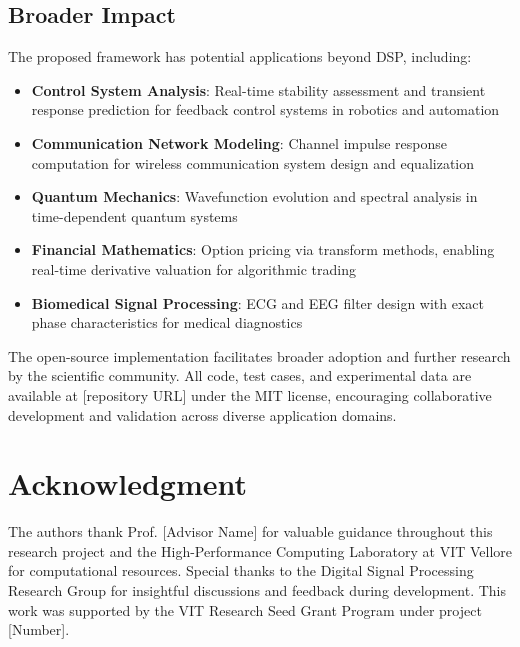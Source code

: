 \documentclass[conference]{IEEEtran}
\begin{document}
\subsection{Broader Impact}

The proposed framework has potential applications beyond DSP, including:

\begin{itemize}
    \item \textbf{Control System Analysis}: Real-time stability assessment and transient response prediction for feedback control systems in robotics and automation
    \item \textbf{Communication Network Modeling}: Channel impulse response computation for wireless communication system design and equalization
    \item \textbf{Quantum Mechanics}: Wavefunction evolution and spectral analysis in time-dependent quantum systems
    \item \textbf{Financial Mathematics}: Option pricing via transform methods, enabling real-time derivative valuation for algorithmic trading
    \item \textbf{Biomedical Signal Processing}: ECG and EEG filter design with exact phase characteristics for medical diagnostics
\end{itemize}

The open-source implementation facilitates broader adoption and further research by the scientific community. All code, test cases, and experimental data are available at [repository URL] under the MIT license, encouraging collaborative development and validation across diverse application domains.

\section*{Acknowledgment}

The authors thank Prof. [Advisor Name] for valuable guidance throughout this research project and the High-Performance Computing Laboratory at VIT Vellore for computational resources. Special thanks to the Digital Signal Processing Research Group for insightful discussions and feedback during development. This work was supported by the VIT Research Seed Grant Program under project [Number].
\end{document}
